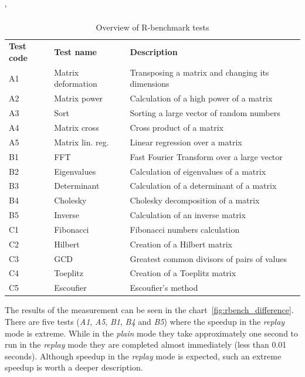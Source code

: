 \documentclass[thesis=M,english,hidelinks]{FITthesis}[2012/10/20]
\begin{document}
		\begin{table}[ht]
			\catcode`
			\centering
			\setlength\extrarowheight{1mm}
			\renewcommand{\tabcolsep}{3pt}
			\begin{tabularx}{\textwidth}{llX}
				\bfseries \bfseries Test code & \bfseries Test name & \bfseries Description\\
				A1 & Matrix deformation & Transposing a matrix and changing its dimensions\\
				A2 & Matrix power & Calculation of a high power of a matrix\\
				A3 & Sort & Sorting a large vector of random numbers\\
				A4 & Matrix cross & Cross product of a matrix\\
				A5 & Matrix lin. reg. & Linear regression over a matrix\\
				B1 & FFT & Fast Fourier Transform over a large vector\\
				B2 & Eigenvalues & Calculation of eigenvalues of a matrix\\
				B3 & Determinant & Calculation of a determinant of a matrix\\
				B4 & Cholesky & Cholesky decomposition of a matrix\\
				B5 & Inverse & Calculation of an inverse matrix\\
				C1 & Fibonacci & Fibonacci numbers calculation\\
				C2 & Hilbert & Creation of a Hilbert matrix\\
				C3 & GCD & Greatest common divisors of pairs of values\\
				C4 & Toeplitz & Creation of a Toeplitz matrix\\
				C5 & Escoufier & Escoufier's method\\
			\end{tabularx}
			\caption{Overview of R-benchmark tests}
		\end{table}
		\FloatBarrier
		
		The results of the measurement can be seen in the chart~\ref{fig:rbench_difference}. There are five tests (\emph{A1}, \emph{A5}, \emph{B1}, \emph{B4} and \emph{B5}) where the speedup in the \emph{replay} mode is extreme. While in the \emph{plain} mode they take approximately one second to run in the \emph{replay} mode they are completed almost immediately (less than 0.01 seconds). Although speedup in the \emph{replay} mode is expected, such an extreme speedup is worth a deeper description.\par
		
\end{document}
